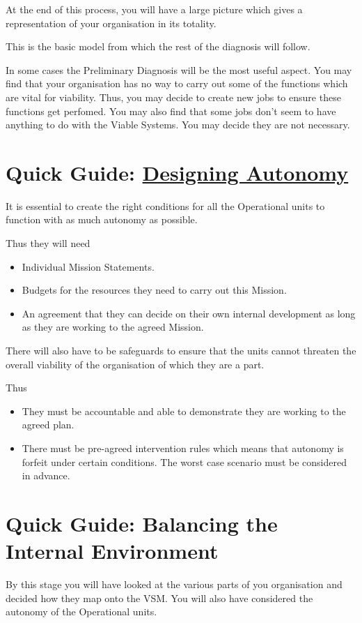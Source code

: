 At the end of this process, you will have a large picture which gives a representation of your organisation in its totality.

This is the basic model from which the rest of the diagnosis will follow.

In some cases the Preliminary Diagnosis will be the most useful aspect. You may find that your organisation has no way to carry out some of the functions which are vital for viability. Thus, you may decide to create new jobs to ensure these functions get perfomed. You may also find that some jobs don't seem to have anything to do with the Viable Systems. You may decide they are not necessary.

\section*{Quick Guide: \hyperref[DESIGNING AUTONOMY]{Designing Autonomy}}
It is essential to create the right conditions for all the Operational units to function with as much autonomy as possible.

Thus they will need

\begin{itemize}
  \item Individual Mission Statements.

  \item Budgets for the resources they need to carry out this Mission.

  \item An agreement that they can decide on their own internal development as long as they are working to the agreed Mission.
\end{itemize}

There will also have to be safeguards to ensure that the units cannot threaten the overall viability of the organisation of which they are a part.

Thus

\begin{itemize}
  \item They must be accountable and able to demonstrate they are working to the agreed plan.

  \item There must be pre-agreed intervention rules which means that autonomy is forfeit under certain conditions. The worst case scenario must be considered in advance.

\end{itemize}

\section*{Quick Guide: Balancing the Internal Environment}
By this stage you will have looked at the various parts of you organisation and decided how they map onto the VSM. You will also have considered the autonomy of the Operational units.


